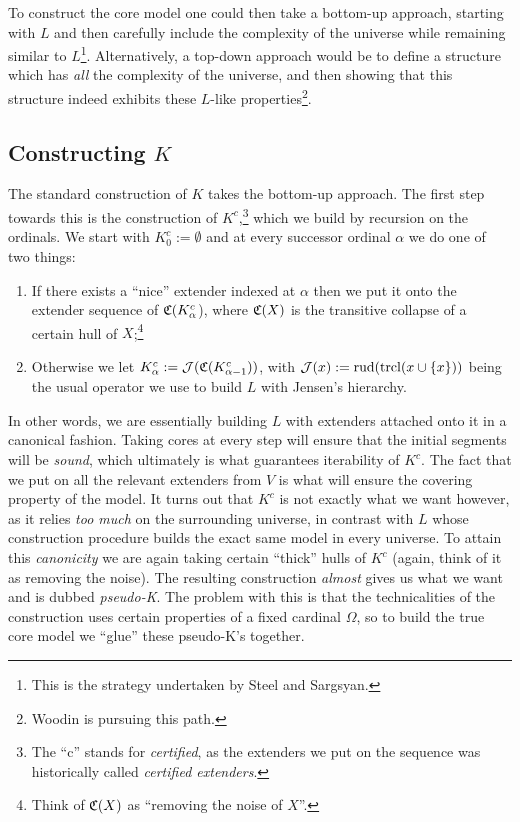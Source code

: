 \documentclass[../../main]{subfiles}
\begin{document}
\qquad To construct the core model one could then take a bottom-up approach, starting with $L$ and then carefully include the complexity of the universe while remaining similar to $L$\footnote{This is the strategy undertaken by Steel and Sargsyan.}. Alternatively, a top-down approach would be to define a structure which has \textit{all} the complexity of the universe, and then showing that this structure indeed exhibits these $L$-like properties\footnote{Woodin is pursuing this path.}.

\subsection{Constructing $K$}

The standard construction of $K$ takes the bottom-up approach. The first step towards this is the construction of $K^c$,\footnote{The ``c'' stands for \textit{certified}, as the extenders we put on the sequence was historically called \textit{certified extenders}.} which we build by recursion on the ordinals. We start with $K^c_0 := \emptyset$ and at every successor ordinal $\alpha$ we do one of two things:

\begin{enumerate}
  \item If there exists a ``nice'' extender indexed at $\alpha$ then we put it onto the extender sequence of $\mathfrak C(K^c_\alpha$), where $\mathfrak C(X)$ is the transitive collapse of a certain hull of $X$;\footnote{Think of $\mathfrak C(X)$ as ``removing the noise of $X$''.}
  \item Otherwise we let $K^c_\alpha := \operatorname{\mathcal J}(\mathfrak C(K^c_{\alpha-1}))$, with $\operatorname{\mathcal J}(x):=\text{rud}(\operatorname{trcl}(x\cup\{x\}))$ being the usual operator we use to build $L$ with Jensen's hierarchy.\\
\end{enumerate}

In other words, we are essentially building $L$ with extenders attached onto it in a canonical fashion. Taking cores at every step will ensure that the initial segments will be \textit{sound}, which ultimately is what guarantees iterability of $K^c$. The fact that we put on all the relevant extenders from $V$ is what will ensure the covering property of the model. It turns out that $K^c$ is not exactly what we want however, as it relies \textit{too much} on the surrounding universe, in contrast with $L$ whose construction procedure builds the exact same model in every universe. To attain this \textit{canonicity} we are again taking certain ``thick'' hulls of $K^c$ (again, think of it as removing the noise). The resulting construction \textit{almost} gives us what we want and is dubbed \textit{pseudo-K}. The problem with this is that the technicalities of the construction uses certain properties of a fixed cardinal $\Omega$, so to build the true core model we ``glue'' these pseudo-K's together.
\end{document}
